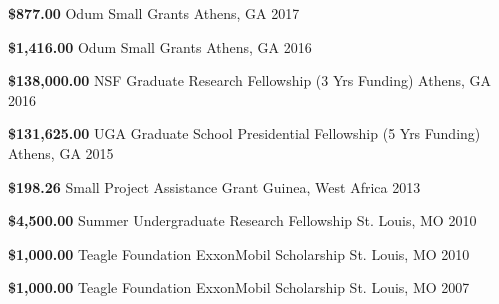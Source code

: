 \begin{cvhonors}
    \cvhonor
      {\textbf{\$877.00}} %
      {Odum Small Grants } %
      {Athens, GA} %
      {2017} %

  \cvhonor
    {\textbf{\$1,416.00}} %
    {Odum Small Grants } %
    {Athens, GA} %
    {2016} %

  \cvhonor
    {\textbf{\$138,000.00}} %
    {NSF Graduate Research Fellowship (3 Yrs Funding)} %
    {Athens, GA} %
    {2016} %

  \cvhonor
    {\textbf{\$131,625.00}} %
    {UGA Graduate School Presidential Fellowship (5 Yrs Funding)} %
    {Athens, GA} %
    {2015} %

  \cvhonor
    {\textbf{\$198.26}} %
    {Small Project Assistance Grant} %
    {Guinea, West Africa} %
    {2013} %

  \cvhonor
    {\textbf{\$4,500.00}} %
    {Summer Undergraduate Research Fellowship} %
    {St. Louis, MO} %
    {2010} %

  \cvhonor
    {\textbf{\$1,000.00}} %
    {Teagle Foundation ExxonMobil Scholarship} %
    {St. Louis, MO} %
    {2010} %

  \cvhonor
    {\textbf{\$1,000.00}} %
    {Teagle Foundation ExxonMobil Scholarship} %
    {St. Louis, MO} %
    {2007} %

\end{cvhonors}
